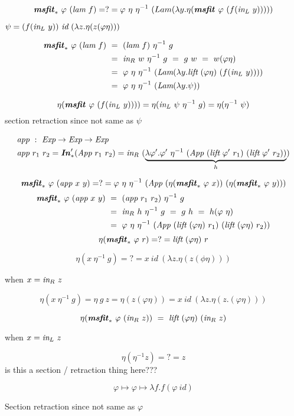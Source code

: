 \[
\textbf{\textit{msfit}}_{*}~\varphi~(\textit{lam}~f)
=?= \varphi~\eta~\eta^{-1}~(Lam(\lambda y.\eta(\textbf{\textit{msfit}}_{~}\varphi~(f(\textit{in}_{L}~y)))))
\]

$\psi = (f(\textit{in}_{L}~y))~\textit{id}~(\lambda z.\eta(z(\varphi\eta)))$

\begin{align*}
\textbf{\textit{msfit}}_{*}~\varphi~(\textit{lam}~f)
&~=~ (\textit{lam}~f)~\eta^{-1}~g \\
&~=~ \textit{in}_{R}~w~\eta^{-1}~g ~=~ g~w ~=~ w(\varphi\eta) \\
&~=~ \varphi~\eta~\eta^{-1}~
	(\textit{Lam}(\lambda y.\textit{lift}~(\varphi\eta)~(f(\textit{in}_{L}~y)))) \\
&~=~ \varphi~\eta~\eta^{-1}~(\textit{Lam}(\lambda y.\psi))
\end{align*}

\[ \eta(\textbf{\textit{msfit}}_{~}\varphi~(f(\textit{in}_{L}~y)))) = \eta(\textit{in}_{L}~\psi~\eta^{-1}~g)
	= \eta(\eta^{-1}~\psi)
\]
section retraction since not same as $\psi$


\begin{align*}
\textit{app} &~:~ \textit{Exp} \to \textit{Exp} \to \textit{Exp} \\
\textit{app} &~ r_1~r_2 = \textbf{\textit{In}}_{*}'(\textit{App}~r_1~r_2)
= \textit{in}_{R}~(\underbrace{
		\lambda \varphi'.\varphi'~\eta^{-1}~
		(\textit{App}~(\textit{lift}~\varphi'~r_1)~(\textit{lift}~\varphi'~r_2))}_h)
\end{align*}


\[ \textbf{\textit{msfit}}_{*}~\varphi~(\textit{app}~x~y)
=?= \varphi~\eta~\eta^{-1}
	~(\textit{App}~(\eta(\textbf{\textit{msfit}}_{*}~\varphi~x))~(\eta(\textbf{\textit{msfit}}_{*}~\varphi~y)))
\]
\begin{align*}
\textbf{\textit{msfit}}_{*}~\varphi~(\textit{app}~x~y)
&~=~ (\textit{app}~r_1~r_2)~\eta^{-1}~g \\
&~=~ \textit{in}_{R}~h~\eta^{-1}~g ~=~ g~h ~=~ h(\varphi~\eta) \\
&~=~ \varphi~\eta~\eta^{-1}
     ~(\textit{App}~(\textit{lift}~(\varphi\eta)~r_1)~(\textit{lift}~(\varphi\eta)~r_2))
\end{align*}
\[ \eta(\textbf{\textit{msfit}}_{*}~\varphi~r) =?= \textit{lift}~(\varphi\eta)~r \]



\[ \eta(x~\eta^{-1}~g) =?= x~\textit{id}~(\lambda z.\eta(z(\phi\eta))) \]

when $x = \textit{in}_{R}~z$

\[
	\eta(x~\eta^{-1}~g) = \eta~g~z = \eta(z(\varphi\eta))
	= x~\textit{id}~(\lambda z.\eta(z.(\varphi\eta)))
\]


\[ \eta(\textbf{\textit{msfit}}_{*}~\varphi~(\textit{in}_{R}~z)) ~=~ \textit{lift}~(\varphi\eta)~(\textit{in}_{R}~z) \]



when $x = \textit{in}_{L}~z$

\[ \eta(\eta^{-1}z) =?= z \]
is this a section / retraction thing here???

\[ \varphi \mapsto \varphi \mapsto \lambda f . f(\varphi~\textit{id}) \]

Section retraction since not same as $\varphi$


